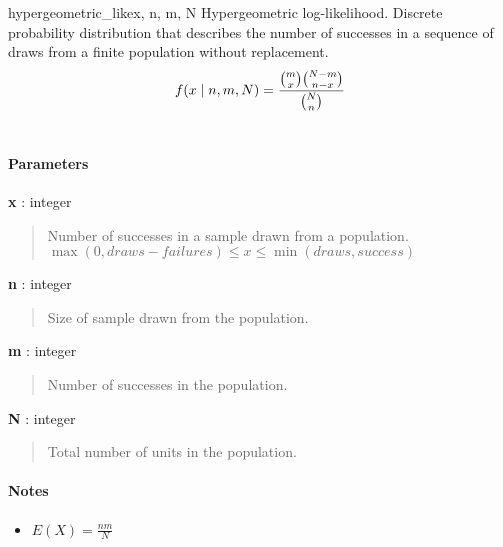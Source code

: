 \hypertarget{pymc.distributions.hypergeometric_like}{}
\begin{funcdesc}{hypergeometric\_like}{x, n, m, N}
Hypergeometric log-likelihood. Discrete probability distribution that
describes the number of successes in a sequence of draws from a finite
population without replacement.
\begin{gather}
\begin{split}f(x \mid n, m, N) = \frac{\binom{m}{x}\binom{N-m}{n-x}}{\binom{N}{n}}\end{split}\notag\\\begin{split}\end{split}\notag
\end{gather}
\paragraph{Parameters}
\begin{paramlist}
\item[] \textbf{x} : integer
\begin{quote}
Number of successes in a sample drawn from a population.
$\max(0, draws-failures) \leq x \leq \min(draws, success)$
\end{quote}
\item[] \textbf{n} : integer
\begin{quote}
Size of sample drawn from the population.
\end{quote}
\item[] \textbf{m} : integer
\begin{quote}
Number of successes in the population.
\end{quote}
\item[] \textbf{N} : integer
\begin{quote}
Total number of units in the population.
\end{quote}
\end{paramlist}
\paragraph{Notes}
\begin{itemize}
\item $E(X) = \frac{n m}{N}$
\end{itemize}
\end{funcdesc}


